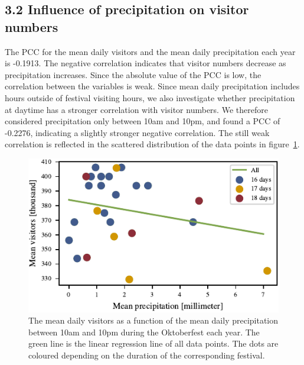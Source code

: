 \documentclass{article}
\theoremstyle{plain}
\theoremstyle{definition}
\theoremstyle{remark}
\begin{document}
\subsection*{3.2 Influence of precipitation on visitor numbers}
The PCC for the mean daily visitors and the mean daily precipitation each year is -0.1913. The negative correlation indicates that visitor numbers decrease as precipitation increases. Since the absolute value of the PCC is low, the correlation between the variables is weak. Since mean daily precipitation includes hours outside of festival visiting hours, we also investigate whether precipitation at daytime has a stronger correlation with visitor numbers. We therefore considered precipitation only between 10am and 10pm, and found a PCC of -0.2276, indicating a slightly stronger negative correlation. The still weak correlation is reflected in the scattered distribution of the data points in figure~\ref{figure_precipitation}.
\begin{figure}[ht]%
  \includegraphics{fig/totalprecipitation.pdf}
  \caption{The mean daily visitors as a function of the mean daily precipitation between 10am and 10pm during the Oktoberfest each year. The green line is the linear regression line of all data points. The dots are coloured depending on the duration of the corresponding festival.}
  \label{figure_precipitation}
\end{figure}
\end{document}
